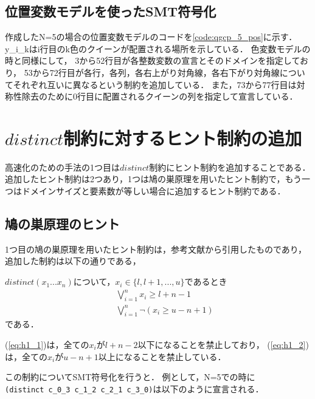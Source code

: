 \subsection{位置変数モデルを使ったSMT符号化}
作成したN=5の場合の位置変数モデルのコードを\ref{code:qgcp_5_pos}に示す．
y\_i\_kはi行目のk色のクイーンが配置される場所を示している．
色変数モデルの時と同様にして，
3から52行目が各整数変数の宣言とそのドメインを指定しており，
53から72行目が各行，各列，各右上がり対角線，各右下がり対角線についてそれぞれ互いに異なるという制約を追加している．
また，73から77行目は対称性除去のために0行目に配置されるクイーンの列を指定して宣言している．




%
%
\section{$distinct$制約に対するヒント制約の追加}\label{sec:hint}
高速化のための手法の1つ目は$distinct$制約にヒント制約を追加することである．
追加したヒント制約は2つあり，1つは鳩の巣原理を用いたヒント制約で，もう一つはドメインサイズと要素数が等しい場合に追加するヒント制約である．

\subsection{鳩の巣原理のヒント}
1つ目の鳩の巣原理を用いたヒント制約は，参考文献\cite{Tamura:queen}から引用したものであり，追加した制約は以下の通りである，

$distinct(x_1 ... x_n)$について，$x_i \in \{l, l+1, ..., u\}$であるとき
\begin{eqnarray}
&& \bigvee_{i=1}^n   x_i \geq l+n-1\\
\label{eq:h1_1}
&& \bigvee_{i=1}^n \lnot(x_i \geq u-n+1)
\label{eq:h1_2}
\end{eqnarray}
である．

(\ref{eq:h1_1})は，全ての$x_i$が$l+n-2$以下になることを禁止しており，
(\ref{eq:h1_2})は，全ての$x_i$が$u-n+1$以上になることを禁止している．

この制約についてSMT符号化を行うと．
例として，N=5での時に\\
\verb|(distinct c_0_3 c_1_2 c_2_1 c_3_0)|は以下のように宣言される．

